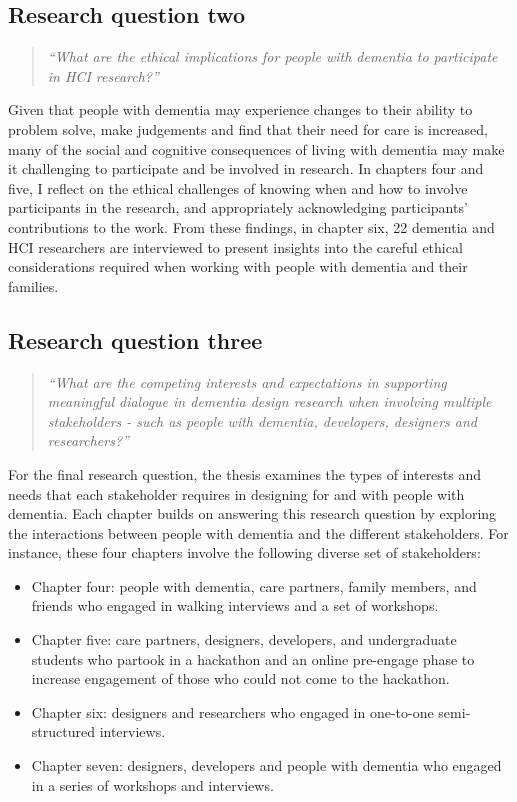 \subsection{Research question two}
\label{RQ2}
\begin{quote}
\textit{``What are the ethical implications for people with dementia to participate in HCI research?''}
\end{quote}
Given that people with dementia may experience changes to their ability to problem solve, make judgements and find that their need for care is increased, many of the social and cognitive consequences of living with dementia may make it challenging to participate and be involved in research. In chapters four and five, I reflect on the ethical challenges of knowing when and how to involve participants in the research, and appropriately acknowledging participants' contributions to the work. From these findings, in chapter six, 22 dementia and HCI researchers are interviewed to present insights into the careful ethical considerations required when working with people with dementia and their families.

\subsection{Research question three}
\label{RQ3}
\begin{quote}
\textit{``What are the competing interests and expectations in supporting meaningful dialogue in dementia design research when involving multiple stakeholders - such as people with dementia, developers, designers and researchers?''}
\end{quote}
For the final research question, the thesis examines the types of interests and needs that each stakeholder requires in designing for and with people with dementia. Each chapter builds on answering this research question by exploring the interactions between people with dementia and the different stakeholders. For instance, these four chapters involve the following diverse set of stakeholders:
\begin{itemize}
\item Chapter four: people with dementia, care partners, family members, and friends who engaged in walking interviews and a set of workshops.
\item Chapter five: care partners, designers, developers, and undergraduate students who partook in a hackathon and an online pre-engage phase to increase engagement of those who could not come to the hackathon.
\item Chapter six: designers and researchers who engaged in one-to-one semi-structured interviews.
\item Chapter seven: designers, developers and people with dementia who engaged in a series of workshops and interviews.
\end{itemize}

